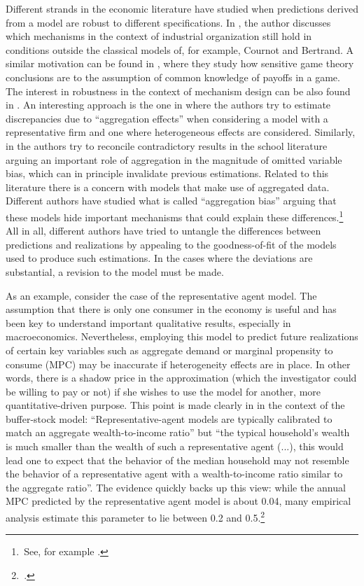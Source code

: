 \documentclass[english, a4paper, 12pt]{article}
\begin{document}
Different strands in the economic literature have studied when predictions derived from a model are robust to different specifications. In \cite{SuttonMarketStruct}, the author discusses which mechanisms in the context of industrial organization still hold in conditions outside the classical models of, for example, Cournot and Bertrand. A similar motivation can be found in \cite{Morris97}, where they study how sensitive game theory conclusions are to the assumption of common knowledge of payoffs in a game. The interest in robustness in the context of mechanism design can be also found in \cite{Morris2011}. An interesting approach is the one in \cite{Basu97} where the authors try to estimate discrepancies due to ``aggregation effects'' when considering a model with a representative firm and one where heterogeneous effects are considered. Similarly, in \cite{SchoolAggregation} the authors try to reconcile contradictory results in the school literature arguing an important role of aggregation in the magnitude of omitted variable bias, which can in principle invalidate previous estimations. Related to this literature there is a concern with models that make use of aggregated data. Different authors have studied what is called ``aggregation bias'' arguing that these models hide important mechanisms that could explain these differences.\footnote{\,See, for example \cite{Agg1, Agg2, Agg3, Agg4}.} All in all, different authors have tried to untangle the differences between predictions and realizations by appealing to the goodness-of-fit of the models used to produce such estimations. In the cases where the deviations are substantial, a revision to the model must be made.

As an example, consider the case of the representative agent model. The assumption that there is only one consumer in the economy is useful and has been key to understand important qualitative results, especially in macroeconomics. Nevertheless, employing this model to predict future realizations of certain key variables such as aggregate demand or marginal propensity to consume (MPC) may be inaccurate if heterogeneity effects are in place. In other words, there is a shadow price in the approximation (which the investigator could be willing to pay or not) if she wishes to use the model for another, more quantitative-driven purpose. This point is made clearly in \cite{CarrollRequiem} in the context of the buffer-stock model: ``Representative-agent models are typically calibrated to match an aggregate wealth-to-income ratio'' but ``the typical household’s wealth is much smaller than the wealth of such a representative agent (...), this would lead one to expect that the behavior of the median household may not resemble the behavior of a representative agent with a wealth-to-income ratio similar to the aggregate ratio''. The evidence quickly backs up this view: while the annual MPC predicted by the representative agent model is about 0.04, many empirical analysis estimate this parameter to lie between 0.2 and 0.5.\footnote{\,\cite{CarrollRequiem}.} 
\end{document}
